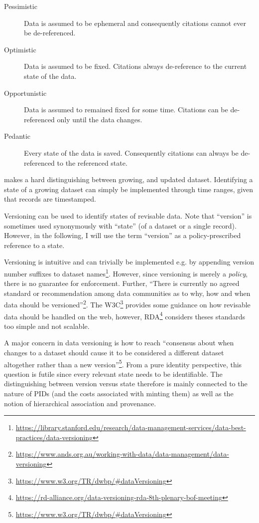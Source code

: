 \documentclass[letterpaper, parskip=half]{scrartcl}
\begin{document}
\begin{description}
  \item[Pessimistic] Data is assumed to be ephemeral and consequently citations cannot ever be de-referenced.
  \item[Optimistic] Data is assumed to be fixed. Citations always de-reference to the current state of the data.
  \item[Opportunistic] Data is assumed to remained fixed for some time. Citations can be de-referenced only until the data changes.
  \item[Pedantic] Every state of the data is saved. Consequently citations can always be de-referenced to the referenced state.  
\end{description}

\citep{Klump2016} makes a hard distinguishing between growing, and updated dataset. Identifying a state of a growing dataset can simply be implemented through time ranges, given that records are timestamped. 

Versioning can be used to identify states of revisable data. Note that ``version'' is sometimes used synonymously with ``state'' (of a dataset or a single record). However, in the following, I will use the term ``version'' as a policy-prescribed reference to a state.

Versioning is intuitive and can trivially be implemented e.g. by appending version number suffixes to dataset names\footnote{\url{https://library.stanford.edu/research/data-management-services/data-best-practices/data-versioning}}. 
However, since versioning is merely a \textit{policy}, there is no guarantee for enforcement. Further, ``There is currently no agreed standard or recommendation among data communities as to why, how and when data should be versioned''\footnote{\url{https://www.ands.org.au/working-with-data/data-management/data-versioning}}.
The W3C\footnote{\url{https://www.w3.org/TR/dwbp/\#dataVersioning}} provides some guidance on how revisable data should be handled on the web, however, \gls{RDA}\footnote{\url{https://rd-alliance.org/data-versioning-rda-8th-plenary-bof-meeting}} considers theses standards too simple and not scalable.

A major concern in data versioning is how to reach ``consensus about when changes to a dataset should cause it to be considered a different dataset altogether rather than a new version''\footnote{\url{https://www.w3.org/TR/dwbp/\#dataVersioning}}.
From a pure identity perspective, this question is futile since every relevant state needs to be identifiable. The distinguishing between version versus state therefore is mainly connected to the nature of \glspl{PID} (and the costs associated with minting them) \citep{Klump2016} as well as the notion of hierarchical association and provenance. 
\end{document}
